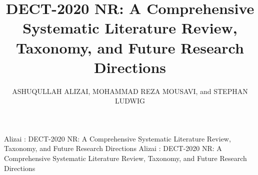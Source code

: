 \documentclass{ieeeaccess}
\begin{document}

\title{DECT-2020 NR: A Comprehensive Systematic Literature Review, Taxonomy, and Future Research Directions}


\author{
\uppercase{Ashuqullah Alizai},
\uppercase{Mohammad Reza Mousavi},
and
\uppercase{Stephan Ludwig}
}

\address[1]{
Aalen University of Applied Sciences, Aalen, Germany
(e-mail: ashuqullah.alizai@hs-aalen.de;
mohammad.mousavi@hs-aalen.de;
stephan.ludwig@hs-aalen.de)
}




\markboth
{Alizai \headeretal: DECT-2020 NR: A Comprehensive Systematic Literature Review, Taxonomy, and Future Research Directions}
{Alizai \headeretal: DECT-2020 NR: A Comprehensive Systematic Literature Review, Taxonomy, and Future Research Directions}


\end{document}
